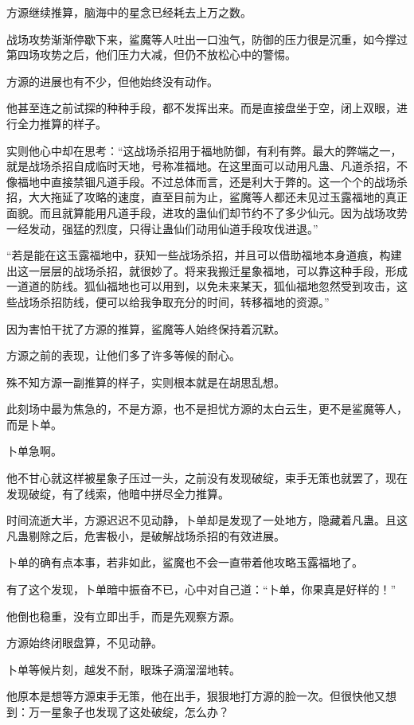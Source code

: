 \begin{this_body}
方源继续推算，脑海中的星念已经耗去上万之数。

战场攻势渐渐停歇下来，鲨魔等人吐出一口浊气，防御的压力很是沉重，如今撑过第四场攻势之后，他们压力大减，但仍不放松心中的警惕。

方源的进展也有不少，但他始终没有动作。

他甚至连之前试探的种种手段，都不发挥出来。而是直接盘坐于空，闭上双眼，进行全力推算的样子。

实则他心中却在思考：“这战场杀招用于福地防御，有利有弊。最大的弊端之一，就是战场杀招自成临时天地，号称准福地。在这里面可以动用凡蛊、凡道杀招，不像福地中直接禁锢凡道手段。不过总体而言，还是利大于弊的。这一个个的战场杀招，大大拖延了攻略的速度，直至目前为止，鲨魔等人都还未见过玉露福地的真正面貌。而且就算能用凡道手段，进攻的蛊仙们却节约不了多少仙元。因为战场攻势一经发动，强猛的烈度，只得让蛊仙们动用仙道手段攻伐进退。”

“若是能在这玉露福地中，获知一些战场杀招，并且可以借助福地本身道痕，构建出这一层层的战场杀招，就很妙了。将来我搬迁星象福地，可以靠这种手段，形成一道道的防线。狐仙福地也可以用到，以免未来某天，狐仙福地忽然受到攻击，这些战场杀招防线，便可以给我争取充分的时间，转移福地的资源。”

因为害怕干扰了方源的推算，鲨魔等人始终保持着沉默。

方源之前的表现，让他们多了许多等候的耐心。

殊不知方源一副推算的样子，实则根本就是在胡思乱想。

此刻场中最为焦急的，不是方源，也不是担忧方源的太白云生，更不是鲨魔等人，而是卜单。

卜单急啊。

他不甘心就这样被星象子压过一头，之前没有发现破绽，束手无策也就罢了，现在发现破绽，有了线索，他暗中拼尽全力推算。

时间流逝大半，方源迟迟不见动静，卜单却是发现了一处地方，隐藏着凡蛊。且这凡蛊剔除之后，危害极小，是破解战场杀招的有效进展。

卜单的确有点本事，若非如此，鲨魔也不会一直带着他攻略玉露福地了。

有了这个发现，卜单暗中振奋不已，心中对自己道：“卜单，你果真是好样的！”

他倒也稳重，没有立即出手，而是先观察方源。

方源始终闭眼盘算，不见动静。

卜单等候片刻，越发不耐，眼珠子滴溜溜地转。

他原本是想等方源束手无策，他在出手，狠狠地打方源的脸一次。但很快他又想到：万一星象子也发现了这处破绽，怎么办？


\end{this_body}
